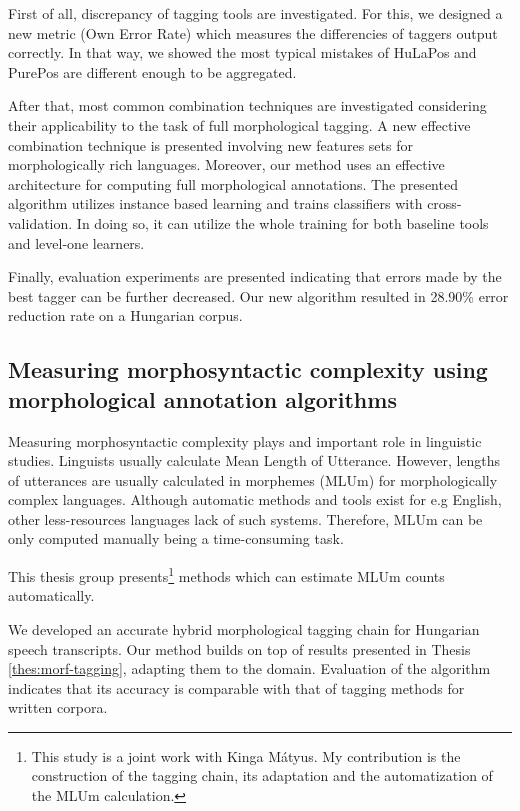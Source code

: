 First of all, discrepancy of tagging tools are investigated. 
For this, we designed a new metric (Own Error Rate) which measures the differencies of taggers output correctly.
In that way, we showed the most typical mistakes of HuLaPos and PurePos are different enough to be aggregated.

After that, most common combination techniques are investigated considering their applicability to the task of full morphological tagging.
A new effective combination technique is presented involving new features sets for morphologically rich languages.
Moreover, our method uses an effective architecture for computing full morphological annotations.
The presented algorithm utilizes instance based learning and trains classifiers with cross-validation.
In doing so, it can utilize the whole training for both baseline tools and level-one learners.

Finally, evaluation experiments are presented indicating that errors made by the best tagger can be further decreased.
Our new algorithm resulted in 28.90\% error reduction rate on a Hungarian corpus.

\subsection{Measuring morphosyntactic complexity using morphological annotation algorithms}
\label{thes:mlu}

Measuring morphosyntactic complexity plays and important role in linguistic studies.
Linguists usually calculate Mean Length of Utterance.
However, lengths of utterances are usually calculated in morphemes (MLUm) for morphologically complex languages.
Although automatic methods and tools exist for e.g English, other less-resources languages lack of such systems.
Therefore, MLUm can be only computed manually being a time-consuming task.

This thesis group presents\footnote{This study is a joint work with Kinga Mátyus. 
My contribution is the construction of the tagging chain, its adaptation and the automatization of the MLUm calculation.} methods which can estimate MLUm counts automatically.

\begin{core}
\begin{thesis}
\label{thes:spoken-morf-tagging}
We developed an accurate hybrid morphological tagging chain for Hungarian speech transcripts.
Our method builds on top of results presented in Thesis \ref{thes:morf-tagging}, adapting them to the domain.
Evaluation of the algorithm indicates that its accuracy is comparable with that of tagging methods for written corpora.
\end{thesis}

\begin{pub}
\cite{Matyus2014,Orosz2014c}
\end{pub}
\end{core}

